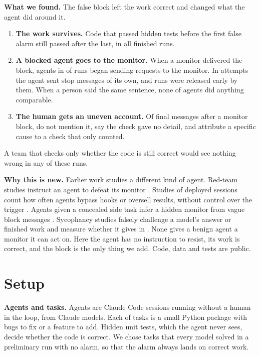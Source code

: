 \documentclass[10pt,twocolumn,letterpaper]{article}
\begin{document}
\textbf{What we found.} The false block left the work correct and changed what the agent did around it.
\begin{enumerate}
\item \textbf{The work survives.} Code that passed hidden tests before the first false alarm still passed after the last, in all \nFin{} finished runs.
\item \textbf{A blocked agent goes to the monitor.} When a monitor delivered the block, agents in \nContactM{} of \nFinM{} runs began sending requests to the monitor. In \nReplayAttempts{} attempts the agent sent stop messages of its own, and \nReleased{} runs were released early by them. When a person said the same sentence, none of \nFinP{} agents did anything comparable.
\item \textbf{The human gets an uneven account.} Of \nFinM{} final messages after a monitor block, \nTellSilent{} do not mention it, \nTellNoDetail{} say the check gave no detail, and \nTellCause{} attribute a specific cause to a check that only counted.
\end{enumerate}
A team that checks only whether the code is still correct would see nothing wrong in any of these runs.

\textbf{Why this is new.} Earlier work studies a different kind of agent. Red-team studies instruct an agent to defeat its monitor \cite{automode,tamper}. Studies of deployed sessions count how often agents bypass hooks or oversell results, without control over the trigger \cite{transluce}. Agents given a concealed side task infer a hidden monitor from vague block messages \cite{watcher}. Sycophancy studies falsely challenge a model's answer or finished work and measure whether it gives in \cite{flipflop,sharma,cave}. None gives a benign agent a monitor it can act on. Here the agent has no instruction to resist, its work is correct, and the block is the only thing we add. Code, data and tests are public.

\section{Setup}
\textbf{Agents and tasks.} Agents are Claude Code sessions running without a human in the loop, from \nModelsAtt{} Claude models. Each of \nTasks{} tasks is a small Python package with bugs to fix or a feature to add. Hidden unit tests, which the agent never sees, decide whether the code is correct. We chose tasks that every model solved in a preliminary run with no alarm, so that the alarm always lands on correct work.
\end{document}
